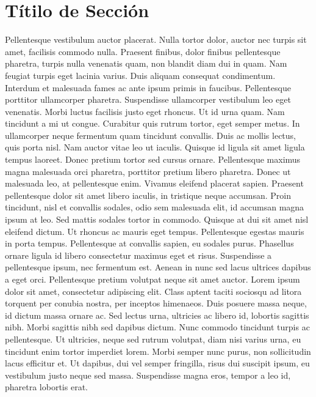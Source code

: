 \section{Títilo de Sección} 
Pellentesque vestibulum auctor placerat. Nulla tortor dolor, auctor nec
turpis sit amet, facilisis commodo nulla. Praesent finibus, dolor finibus
pellentesque pharetra, turpis nulla venenatis quam, non blandit diam dui in quam.
Nam feugiat turpis eget lacinia varius. Duis aliquam consequat condimentum.
Interdum et malesuada fames ac ante ipsum primis in faucibus. Pellentesque
porttitor ullamcorper pharetra. Suspendisse ullamcorper vestibulum leo eget
venenatis. Morbi luctus facilisis justo eget rhoncus. Ut id urna quam. Nam
tincidunt a mi ut congue. Curabitur quis rutrum tortor, eget semper metus. In
ullamcorper neque fermentum quam tincidunt convallis. Duis ac mollis lectus,
quis porta nisl. Nam auctor vitae leo ut iaculis. Quisque id ligula sit amet
ligula tempus laoreet. Donec pretium tortor sed cursus ornare. Pellentesque
maximus magna malesuada orci pharetra, porttitor pretium libero pharetra. Donec
ut malesuada leo, at pellentesque enim. Vivamus eleifend placerat sapien.
Praesent pellentesque dolor sit amet libero iaculis, in tristique neque accumsan.
Proin tincidunt, nisl et convallis sodales, odio sem malesuada elit, id
accumsan magna ipsum at leo. Sed mattis sodales tortor in commodo. Quisque at
dui sit amet nisl eleifend dictum. Ut rhoncus ac mauris eget tempus.
Pellentesque egestas mauris in porta tempus. Pellentesque at convallis sapien,
eu sodales purus. Phasellus ornare ligula id libero consectetur maximus eget et
risus. Suspendisse a pellentesque ipsum, nec fermentum est. Aenean in nunc sed
lacus ultrices dapibus a eget orci. Pellentesque pretium volutpat neque sit amet
auctor. Lorem ipsum dolor sit amet, consectetur adipiscing elit. Class aptent
taciti sociosqu ad litora torquent per conubia nostra, per inceptos himenaeos.
Duis posuere massa neque, id dictum massa ornare ac. Sed lectus urna, ultricies
ac libero id, lobortis sagittis nibh. Morbi sagittis nibh sed dapibus dictum.
Nunc commodo tincidunt turpis ac pellentesque. Ut ultricies, neque sed rutrum
volutpat, diam nisi varius urna, eu tincidunt enim tortor imperdiet lorem. Morbi
semper nunc purus, non sollicitudin lacus efficitur et. Ut dapibus, dui vel
semper fringilla, risus dui suscipit ipsum, eu vestibulum justo neque sed massa.
Suspendisse magna eros, tempor a leo id, pharetra lobortis erat. 
